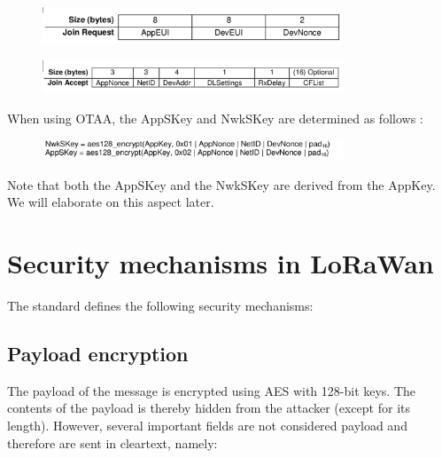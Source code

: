 \begin{figure}[h!]
{\includegraphics[width=0.8\textwidth]{images/image16.png}}
\end{figure}

\begin{figure}[h!]
{\includegraphics[width=0.8\textwidth]{images/image6.png}}
\end{figure}

{When using OTAA, the AppSKey and NwkSKey are determined as follows \cite{spec}:}

\begin{figure}[h!]
{\includegraphics[width=0.8\textwidth]{images/image4.png}}
\end{figure}

{Note that both the AppSKey and the NwkSKey are derived from the AppKey.
We will elaborate on this aspect later.}

\section{Security mechanisms in LoRaWan}

{The standard defines the following security mechanisms:}

\subsection{Payload encryption}

{The payload of the message is encrypted using AES with 128-bit keys.
The contents of the payload is thereby hidden from the attacker (except
for its length). However, several important fields are
not considered payload and therefore are sent in cleartext, namely:}

